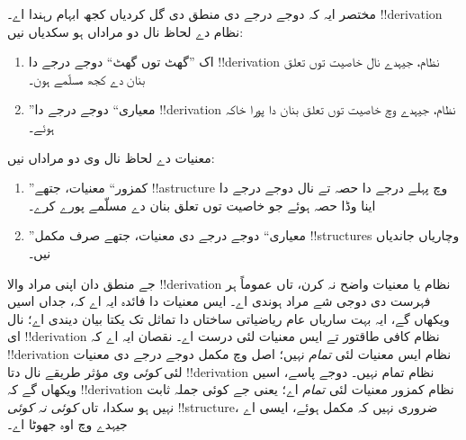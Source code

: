\documentclass[../../../include/open-logic-section]{subfiles}
\begin{document}
مختصر ایہ کہ دوجے درجے دی منطق دی گل
کردیاں کجھ ابہام رہندا اے۔ !!{derivation}
نظام دے لحاظ نال دو مراداں ہو سکدیاں نیں:
\begin{enumerate}
\item اک ”گھٹ توں گھٹ“ دوجے درجے دا
  !!{derivation} نظام، جیہدے نال خاصیت
  توں تعلق بنان دے کجھ مسلّمے ہون۔
\item ”معیاری“ دوجے درجے دا
  !!{derivation} نظام، جیہدے وچ
  خاصیت توں تعلق بنان دا پورا خاکہ ہوئے۔
\end{enumerate}
معنیات دے لحاظ نال وی دو مراداں نیں:
\begin{enumerate}
\item ”کمزور“ معنیات، جتھے !!a{structure}
  وچ پہلے درجے دا حصہ تے نال دوجے درجے
  دا اینا وڈا حصہ ہوئے جو خاصیت توں
  تعلق بنان دے مسلّمے پورے کرے۔
\item ”معیاری“ دوجے درجے دی معنیات،
  جتھے صرف مکمل !!{structure}s وچاریاں
  جاندیاں نیں۔
\end{enumerate}
جے منطق دان اپنی مراد والا
!!{derivation} نظام یا معنیات واضح نہ کرن،
تاں عموماً ہر فہرست دی دوجی شے مراد
ہوندی اے۔ ایس معنیات دا فائدہ ایہ اے
کہ، جداں اسیں ویکھاں گے، ایہ بہت ساریاں
عام ریاضیاتی ساختاں دا
تماثل تک یکتا بیان دیندی اے؛
نال ای !!{derivation} نظام کافی طاقتور
تے ایس معنیات لئی درست اے۔ نقصان ایہ اے
کہ !!{derivation} نظام ایس معنیات لئی
\emph{تمام} نہیں؛ اصل وچ مکمل دوجے درجے
دی معنیات لئی \emph{کوئی وی} مؤثر طریقے
نال دتا !!{derivation} نظام تمام نہیں۔
دوجے پاسے، اسیں ویکھاں گے کہ
!!{derivation} نظام کمزور معنیات لئی
\emph{تمام} اے؛ یعنی جے کوئی جملہ
ثابت نہیں ہو سکدا، تاں \emph{کوئی نہ
کوئی} !!{structure}، ضروری نہیں کہ
مکمل ہوئے، ایسی اے جیہدے وچ اوہ
جھوٹا اے۔
\end{document}
